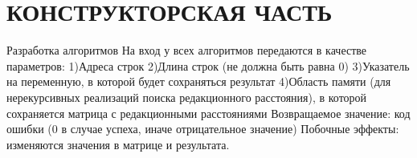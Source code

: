 \newpage
\section*{КОНСТРУКТОРСКАЯ ЧАСТЬ}

Разработка алгоритмов
На вход у всех алгоритмов передаются в качестве параметров:
1)Адреса строк
2)Длина строк (не должна быть равна 0)
3)Указатель на переменную, в которой будет сохраняться результат
4)Область памяти (для нерекурсивных реализаций поиска редакционного расстояния), в которой
сохраняется матрица с редакционными расстояниями
Возвращаемое значение: код ошибки (0 в случае успеха, иначе отрицательное значение)
Побочные эффекты: изменяются значения в матрице и результата.
